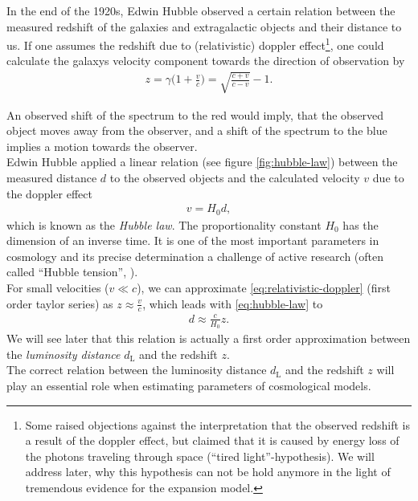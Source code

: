 \noindent In the end of the 1920s, Edwin Hubble observed a certain relation between the measured redshift of the galaxies and extragalactic objects and their distance to us. If one assumes the redshift due to (relativistic) doppler effect\footnote{Some raised objections against the interpretation that the observed redshift is a result of the doppler effect, but claimed that it is caused by energy loss of the photons traveling through space (``tired light''-hypothesis). We will address later, why this hypothesis can not be hold anymore in the light of tremendous evidence for the expansion model.}, one could calculate the galaxys velocity component towards the direction of observation by
\begin{align}
    z = \gamma \biggl( 1 + \frac{v}{c} \biggr) = \sqrt{\frac{c + v}{c - v}} - 1. \label{eq:relativistic-doppler}
\end{align} 

\noindent An observed shift of the spectrum to the red would imply, that the observed object moves away from the observer, and a shift of the spectrum to the blue implies a motion towards the observer. \\
\noindent Edwin Hubble applied a linear relation (see figure \ref{fig:hubble-law}) between the measured distance $d$ to the observed objects and the calculated velocity $v$ due to the doppler effect
\begin{align}
    v = H_{0} d, \label{eq:hubble-law}
\end{align}
which is known as the \textit{Hubble law}. The proportionality constant $H_{0}$ has the dimension of an inverse time. It is one of the most important parameters in cosmology and its precise determination a challenge of active research (often called ``Hubble tension'', \cite{DiValentino2021}). \\ 

\noindent For small velocities ($v \ll c$), we can approximate \eqref{eq:relativistic-doppler} (first order taylor series) as $\displaystyle z \approx \frac{v}{c}$, which leads with \eqref{eq:hubble-law} to 
\begin{align}
    d \approx \frac{c}{H_{0}} z. \label{eq:lum-dist-approx} 
\end{align}
We will see later that this relation is actually a first order approximation between the \textit{luminosity distance} $d_{\text{L}}$ and the redshift $z$. \\
The correct relation between the luminosity distance $d_{\text{L}}$ and the redshift $z$ will play an essential role when estimating parameters of cosmological models.

